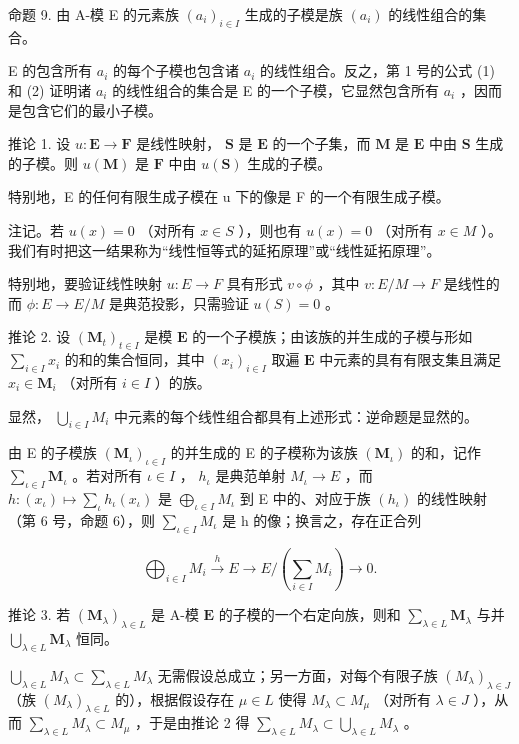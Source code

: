 命题 9. 由 A-模 E 的元素族 \((a_{i})_{i\in I}\) 生成的子模是族 \((a_{i})\) 的线性组合的集合。

E 的包含所有 \(a_{i}\) 的每个子模也包含诸 \(a_{i}\) 的线性组合。反之，第 1 号的公式 (1) 和 (2) 证明诸 \(a_{i}\) 的线性组合的集合是 E 的一个子模，它显然包含所有 \(a_{i}\) ，因而是包含它们的最小子模。

推论 1. 设 \(u: \mathbf{E} \to \mathbf{F}\) 是线性映射， \(\mathbf{S}\) 是 \(\mathbf{E}\) 的一个子集，而 \(\mathbf{M}\) 是 \(\mathbf{E}\) 中由 \(\mathbf{S}\) 生成的子模。则 \(u(\mathbf{M})\) 是 \(\mathbf{F}\) 中由 \(u(\mathbf{S})\) 生成的子模。

特别地，E 的任何有限生成子模在 u 下的像是 F 的一个有限生成子模。

注记。若 \(u(x) = 0\) （对所有 \(x \in S\) ），则也有 \(u(x) = 0\) （对所有 \(x \in M\) ）。我们有时把这一结果称为“线性恒等式的延拓原理”或“线性延拓原理”。

特别地，要验证线性映射 \(u:E\to F\) 具有形式 \(v\circ\phi\) ，其中 \(v:E/M\to F\) 是线性的而 \(\phi:E\to E/M\) 是典范投影，只需验证 \(u(S)=0\) 。

推论 2. 设 \((\mathbf{M}_{t})_{t\in I}\) 是模 \(\mathbf{E}\) 的一个子模族；由该族的并生成的子模与形如 \(\sum_{i\in I}x_i\) 的和的集合恒同，其中 \((x_{i})_{i\in I}\) 取遍 \(\mathbf{E}\) 中元素的具有有限支集且满足 \(x_{i}\in \mathbf{M}_{i}\) （对所有 \(i\in I\) ）的族。

显然， \(\bigcup_{i\in I}M_i\) 中元素的每个线性组合都具有上述形式：逆命题是显然的。

由 E 的子模族 \((\mathbf{M}_{\iota})_{\iota\in I}\) 的并生成的 E 的子模称为该族 \((\mathbf{M}_{\iota})\) 的和，记作 \(\sum_{\iota\in I}\mathbf{M}_{\iota}\) 。若对所有 \(\iota\in I\) ， \(h_{\iota}\) 是典范单射 \(M_{\iota}\to E\) ，而 \(h:(x_{\iota})\mapsto\sum_{\iota}h_{\iota}(x_{\iota})\) 是 \(\bigoplus_{\iota\in I}M_{\iota}\) 到 E 中的、对应于族 \((h_{\iota})\) 的线性映射（第 6 号，命题 6），则 \(\sum_{\iota\in I}M_{\iota}\) 是 h 的像；换言之，存在正合列

\[
\bigoplus_ {i \in I} M _ {i} \xrightarrow {h} E \longrightarrow E / \left(\sum_ {i \in I} M _ {i}\right) \longrightarrow 0.\tag{28}
\]

推论 3. 若 \((\mathbf{M}_{\lambda})_{\lambda \in L}\) 是 A-模 \(\mathbf{E}\) 的子模的一个右定向族，则和 \(\sum_{\lambda \in L} \mathbf{M}_{\lambda}\) 与并 \(\bigcup_{\lambda \in L} \mathbf{M}_{\lambda}\) 恒同。

\(\bigcup_{\lambda \in L} M_{\lambda} \subset \sum_{\lambda \in L} M_{\lambda}\) 无需假设总成立；另一方面，对每个有限子族 \((M_{\lambda})_{\lambda \in J}\) （族 \((M_{\lambda})_{\lambda \in L}\) 的），根据假设存在 \(\mu \in L\) 使得 \(M_{\lambda} \subset M_{\mu}\) （对所有 \(\lambda \in J\) ），从而 \(\sum_{\lambda \in L} M_{\lambda} \subset M_{\mu}\) ，于是由推论 2 得 \(\sum_{\lambda \in L} M_{\lambda} \subset \bigcup_{\lambda \in L} M_{\lambda}\) 。

